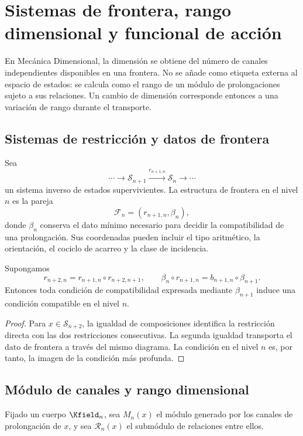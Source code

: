 \chapter{Sistemas de frontera, rango dimensional y funcional de acción}
\label{chap:pantalla}

En Mecánica Dimensional, la dimensión se obtiene del número de canales
independientes disponibles en una frontera. No se añade como etiqueta externa
al espacio de estados: se calcula como el rango de un módulo de prolongaciones
sujeto a sus relaciones. Un cambio de dimensión corresponde entonces a una
variación de rango durante el transporte.

\section{Sistemas de restricción y datos de frontera}

Sea
\[
 \cdots\longrightarrow\mathcal S_{n+1}
 \xrightarrow{r_{n+1,n}}\mathcal S_n\longrightarrow\cdots
\]
un sistema inverso de estados supervivientes. La estructura de frontera en el
nivel \(n\) es la pareja
\[
 \mathcal F_n=(r_{n+1,n},\beta_n),
\]
donde \(\beta_n\) conserva el dato mínimo necesario para decidir la
compatibilidad de una prolongación. Sus coordenadas pueden incluir el tipo
aritmético, la orientación, el cociclo de acarreo y la clase de incidencia.

\begin{lemma}
Supongamos
\[
 r_{n+2,n}=r_{n+1,n}\circ r_{n+2,n+1},
 \qquad
 \beta_n\circ r_{n+1,n}
 =b_{n+1,n}\circ\beta_{n+1}.
\]
Entonces toda condición de compatibilidad expresada mediante \(\beta_{n+1}\)
induce una condición compatible en el nivel \(n\).
\end{lemma}
\begin{proof}
Para \(x\in\mathcal S_{n+2}\), la igualdad de composiciones identifica la
restricción directa con las dos restricciones consecutivas. La segunda
igualdad transporta el dato de frontera a través del mismo diagrama. La
condición en el nivel \(n\) es, por tanto, la imagen de la condición más
profunda.
\end{proof}

\section{Módulo de canales y rango dimensional}

Fijado un cuerpo \(\Kfield_n\), sea \(M_n(x)\) el módulo generado por los
canales de prolongación de \(x\), y sea \(\mathcal R_n(x)\) el submódulo de
relaciones entre ellos.

